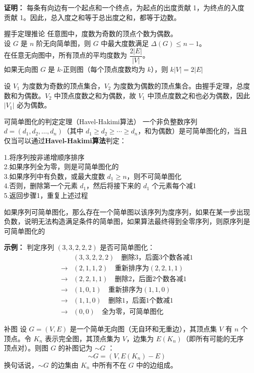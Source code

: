 \documentclass[lang=cn,11pt]{elegantbook}
\begin{document}
\textbf{证明：} 每条有向边有一个起点和一个终点，为起点的出度贡献 1，为终点的入度贡献 1。因此，总入度之和等于总出度之和，都等于边数。
\begin{theorem}{握手定理推论}
任意图中，度数为奇数的顶点个数为偶数。\\
设 $G$ 是 $n$ 阶无向简单图，则 $G$ 中最大度数满足 $\Delta(G) \leqslant n-1$。\\
在任意无向图中，所有顶点的平均度数为 $\dfrac{2|E|}{|V|}$。\\
如果无向图 $G$ 是 $k$-正则图（每个顶点度数均为 $k$），则 $k|V| = 2|E|$
\end{theorem}
设 $V_1$ 为度数为奇数的顶点集合，$V_2$ 为度数为偶数的顶点集合。由握手定理，总度数和为偶数。$V_2$ 中顶点度数之和为偶数，故 $V_1$ 中顶点度数之和也必为偶数，因此 $|V_1|$ 必为偶数。

\begin{theorem}{可简单图化的判定定理（Havel-Hakimi算法）}
一个非负整数序列 $d = (d_1, d_2, \ldots, d_n)$（其中 $d_1 \geqslant d_2 \geqslant \cdots \geqslant d_n$，和为偶数）是可简单图化的，当且仅当可以通过\textbf{Havel-Hakimi算法}判定：

1.将序列按非递增顺序排序\\
2.如果序列全为零，则是可简单图化的\\
3.如果序列中有负数，或最大度数 $d_1 \geqslant n$，则不可简单图化\\
4.否则，删除第一个元素 $d_1$，然后将接下来的 $d_1$ 个元素每个减1\\
5.返回步骤1，重复上述过程

如果序列可简单图化，那么存在一个简单图以该序列为度序列，如果在某一步出现负数，说明无法构造满足条件的简单图，如果算法最终得到全零序列，则原序列是可简单图化的
\end{theorem}
\textbf{示例：}
判定序列 $(3, 3, 2, 2, 2)$ 是否可简单图化：
\begin{align*}
& (3, 3, 2, 2, 2) \quad \text{删除3，后面3个数各减1} \\
\to & (2, 1, 1, 2) \quad \text{重新排序为}(2, 2, 1, 1) \\
\to & (2, 2, 1, 1) \quad \text{删除2，后面2个数各减1} \\
\to & (1, 0, 1) \quad \text{重新排序为}(1, 1, 0) \\
\to & (1, 1, 0) \quad \text{删除1，后面1个数减1} \\
\to & (0, 0) \quad \text{全为零，可简单图化}
\end{align*}
\begin{definition}{补图}
设 $G = (V, E)$ 是一个简单无向图（无自环和无重边），其顶点集 $V$ 有 $n$ 个顶点。令 $K_n$ 表示完全图，其顶点集为 $V$，边集为 $E(K_n)$（即所有可能的无序顶点对）。则图 $G$ 的补图记为 $\sim G$ ：
\[
\sim G = (V, E(K_n) -E)
\]
换句话说，$\sim G$ 的边集由 $K_n$ 中所有不在 $G$ 中的边组成。
\end{definition}
\end{document}
